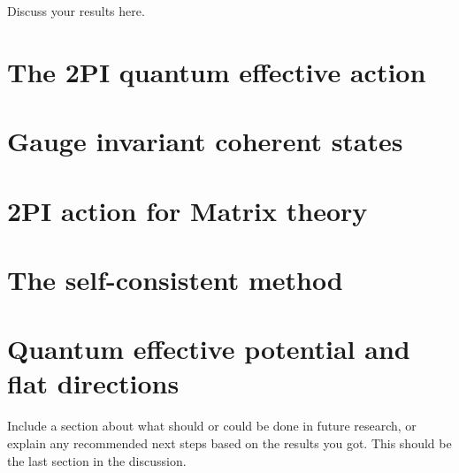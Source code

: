 
Discuss your results here.

\section{The 2PI quantum effective action}

\section{Gauge invariant coherent states}

\section{2PI action for Matrix theory}

\section{The self-consistent method}

\section{Quantum effective potential and flat directions}

Include a section about what should or could be done in future research, or explain any recommended next steps based on the results you got. This should be the last section in the discussion.